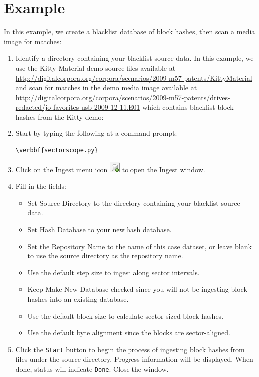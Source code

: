 \documentclass[11pt,fleqn]{article} %
\begin{document}
\section{Example}
In this example, we create a blacklist database of block hashes, then scan a media image for matches:

\begin{enumerate}
\item Identify a directory containing your blacklist source data.
In this example, we use the Kitty Material demo source files available at \url{http://digitalcorpora.org/corpora/scenarios/2009-m57-patents/KittyMaterial} and scan for matches in the demo media image available at \url{http://digitalcorpora.org/corpora/scenarios/2009-m57-patents/drives-redacted/jo-favorites-usb-2009-12-11.E01} which contains blacklist block hashes from the Kitty demo:
\item Start \sscope by typing the following at a command prompt:
\begin{Verbatim}[commandchars=\\\{\}]
\verbbf{sectorscope.py}
\end{Verbatim} 
\item Click on the Ingest menu icon 
\includegraphics[scale=.4]{screenshots/ingest_menu_icon}
to open the \sscope Ingest window.
\item Fill in the fields:
  \begin{itemize}
  \item Set Source Directory to the directory containing your blacklist source data.
  \item Set Hash Database to your new hash database.
  \item Set the Repository Name to the name of this case dataset, or leave blank to use the source directory as the repository name.
  \item Use the default step size to ingest along sector intervals.
  \item Keep Make New Database checked since you will not be ingesting block hashes into an existing database.
  \item Use the default block size to calculate sector-sized block hashes.
  \item Use the default byte alignment since the blocks are sector-aligned.
  \end{itemize}
\item Click the \verb+Start+ button to begin the process of ingesting block hashes from files under the source directory. Progress information will be displayed. When done, status will indicate \verb+Done+. Close the window.

\end{enumerate}
\end{document}
